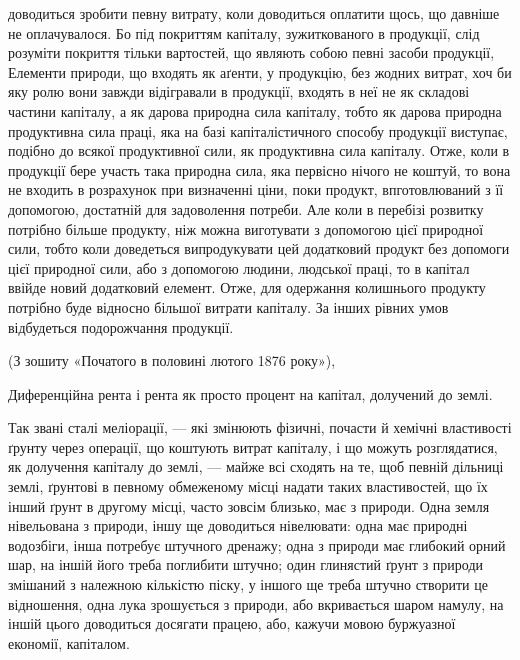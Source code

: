 \parcont{}  %
доводиться зробити певну витрату, коли доводиться оплатити щось, що давніше
не оплачувалося. Бо під покриттям капіталу, зужиткованого в продукції, слід
розуміти покриття тільки вартостей, що являють собою певні засоби продукції,
Елементи природи, що входять як аґенти, у продукцію, без жодних витрат,
хоч би яку ролю вони завжди відігравали в продукції, входять в неї не як складові
частини капіталу, а як дарова природна сила капіталу, тобто як дарова природна
продуктивна сила праці, яка на базі капіталістичного способу продукції
виступає, подібно до всякої продуктивної сили, як продуктивна сила капіталу.
Отже, коли в продукції бере участь така природна сила, яка первісно
нічого не коштуй, то вона не входить в розрахунок при визначенні ціни, поки
продукт, впготовлюваний з її допомогою, достатній для задоволення потреби.
Але коли в перебізі розвитку потрібно більше продукту, ніж можна виготувати
з допомогою цієї природної сили, тобто коли доведеться випродукувати
цей додатковий продукт без допомоги цієї природної сили, або з допомогою
людини, людської праці, то в капітал ввійде новий додатковий елемент. Отже,
для одержання колишнього продукту потрібно буде відносно більшої витрати
капіталу. За інших рівних умов відбудеться подорожчання продукції.

(З зошиту «Початого в половині лютого 1876 року»),

Диференційна рента і рента як просто процент на капітал,
долучений до землі.

Так звані сталі меліорації, — які змінюють фізичні, почасти й хемічні
властивості ґрунту через операції, що коштують витрат капіталу, і що можуть
розглядатися, як долучення капіталу до землі, — майже всі сходять на те,
щоб певній дільниці землі, ґрунтові в певному обмеженому місці надати таких
властивостей, що їх інший ґрунт в другому місці, часто зовсім близько, має
з природи. Одна земля нівельована з природи, іншу ще доводиться нівелювати:
одна має природні водозбіги, інша потребує штучного дренажу; одна з природи
має глибокий орний шар, на іншій його треба поглибити штучно; один глинястий
ґрунт з природи змішаний з належною кількістю піску, у іншого ще
треба штучно створити це відношення, одна лука зрошується з природи, або
вкривається шаром намулу, на іншій цього доводиться досягати працею, або,
кажучи мовою буржуазної економії, капіталом.

